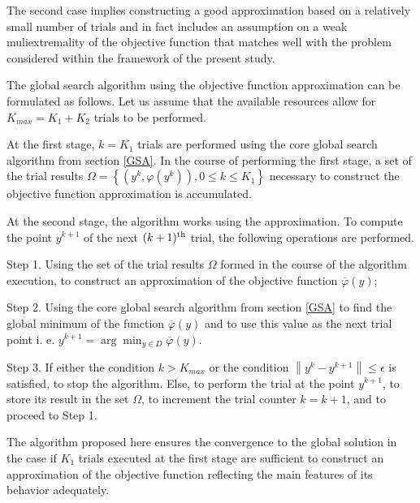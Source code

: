 \documentclass[mathematics,article,submit,pdftex,moreauthors]{Definitions/mdpi}
\begin{document}
The second case implies constructing a good approximation based on a relatively small number of trials and in fact includes an assumption on a weak muliextremality of the objective function that matches well with the problem considered within the framework of the present study.
 
The global search algorithm using the objective function approximation can be formulated as follows.
Let us assume that the available resources allow for $K_{max} = K_1 + K_2$ trials to be performed.

At the first stage, $k = K_1$ trials are performed using the core global search algorithm from section \ref{GSA}.
In the course of performing the first stage, a set of the trial results $\Omega = \left\{(y^k, \varphi(y^k)), 0\leq k\leq K_1\right\}$ necessary to construct the objective function approximation is accumulated.

At the second stage, the algorithm works using the approximation. To compute the point $y^{k+1}$ of the next $(k+1)^{\rm th}$ trial, the following operations are performed.

Step 1. Using the set of the trial results $\Omega$ formed in the course of the algorithm execution, to construct an approximation of the objective function $\overline{\varphi}(y)$;

Step 2. Using the core global search algorithm from section \ref{GSA} to find the global minimum of the function $\overline{\varphi}(y)$ and to use this value as the next trial point i. e. $y^{k+1} = \arg \min_{y \in D} \overline{\varphi}(y)$.

Step 3. If either the condition $k>K_{max}$ or the condition $\left\|y^k - y^{k+1}\right\| \leq \epsilon$ is satisfied, to stop the algorithm.
Else, to perform the trial at the point $y^{k+1}$, to store its result in the set $\Omega$, to increment the trial counter $k = k+1$, and to proceed to Step 1.

The algorithm proposed here ensures the convergence to the global solution in the case if $K_1$ trials executed at the first stage are sufficient to construct an approximation of the objective function reflecting the main features of its behavior adequately.



\end{document}

